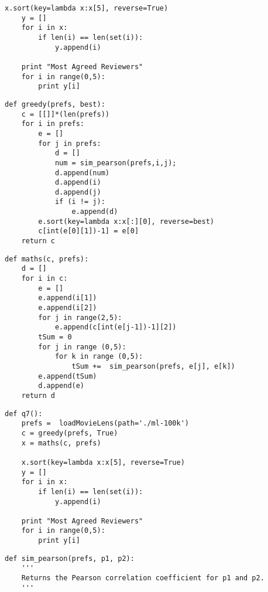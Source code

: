 \begin{flushleft}
\begin{lstlisting}[caption={Python code for question 7}]
    x.sort(key=lambda x:x[5], reverse=True)
    y = []
    for i in x:
        if len(i) == len(set(i)):
            y.append(i)

    print "Most Agreed Reviewers"
    for i in range(0,5):
        print y[i]
\end{lstlisting}

\begin{lstlisting}[caption={Greddy Algorithm for determining most correlated reviewer}]
def greedy(prefs, best):
    c = [[]]*(len(prefs))
    for i in prefs:
        e = []
        for j in prefs:
            d = []
            num = sim_pearson(prefs,i,j);
            d.append(num)
            d.append(i)
            d.append(j)
            if (i != j):
                e.append(d)
        e.sort(key=lambda x:x[:][0], reverse=best)
        c[int(e[0][1])-1] = e[0]       
    return c 
\end{lstlisting}


\begin{lstlisting}[caption={Determining chain of 5 reviewers from correlated}]
def maths(c, prefs):
    d = []
    for i in c:
        e = []
        e.append(i[1])
        e.append(i[2])
        for j in range(2,5):
            e.append(c[int(e[j-1])-1][2])
        tSum = 0
        for j in range (0,5):
            for k in range (0,5):
                tSum +=  sim_pearson(prefs, e[j], e[k])
        e.append(tSum)
        d.append(e)
    return d
\end{lstlisting}


\begin{lstlisting}[caption={Python code for question 7}]
def q7():
    prefs =  loadMovieLens(path='./ml-100k')   
    c = greedy(prefs, True)
    x = maths(c, prefs)

    x.sort(key=lambda x:x[5], reverse=True)
    y = []
    for i in x:
        if len(i) == len(set(i)):
            y.append(i)

    print "Most Agreed Reviewers"
    for i in range(0,5):
        print y[i]
\end{lstlisting}

\begin{lstlisting}[caption={Correlation between two reviewers}]
def sim_pearson(prefs, p1, p2):
    '''
    Returns the Pearson correlation coefficient for p1 and p2.
    '''


\end{lstlisting}
\end{flushleft}
